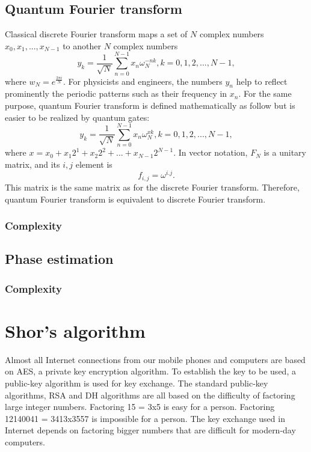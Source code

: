 \documentclass[oneside, letter, 12pt]{book}
\begin{document}
\subsection{Quantum Fourier transform}
Classical discrete Fourier transform maps a set of $N$ complex numbers ${x_0, x_1, ..., x_{N-1}}$ to another $N$ complex numbers
\begin{equation}
    y_k = \frac 1 {\sqrt{N}} \sum^{N-1}_{n=0} x_n\omega_{N}^{-nk}, k = 0, 1, 2, ..., N-1,
\end{equation}
where $w_N = e^{\frac {2\pi i} N }$. For physicists and engineers, the numbers ${y_n}$ help to reflect prominently the periodic patterns such as their frequency in $x_n$. For the same purpose, quantum Fourier transform is defined mathematically as follow but is easier to be realized by quantum gates:
\begin{equation}
    y_k = \frac 1 {\sqrt{N}} \sum^{N-1}_{n=0} x_n\omega_{N}^{xk}, k = 0, 1, 2, ..., N-1,
\end{equation}
where $x = x_0 + x_1 2^1 + x_2 2^2 + ... +x_{N-1} 2^{N-1}$. In vector notation, $F_N$ is a unitary matrix, and its $i, j$ element is
\begin{equation}
    f_{i,j} = \omega^{i.j}.
\end{equation}
This matrix is the same matrix as for the discrete Fourier transform. Therefore, quantum Fourier transform is equivalent to discrete Fourier transform.

\subsubsection{Complexity}

\subsection{Phase estimation}
\subsubsection{Complexity}

\section{Shor's algorithm}
Almost all Internet connections from our mobile phones and computers are based on AES, a private key encryption algorithm. To establish the key to be used, a public-key algorithm is used for key exchange. The standard public-key algorithms, RSA and DH algorithms are all based on the difficulty of factoring large integer numbers. Factoring 15 = 3x5 is easy for a person. Factoring 12140041 = 3413x3557 is impossible for a person. The key exchange used in Internet depends on factoring bigger numbers that are difficult for modern-day computers.
\end{document}
